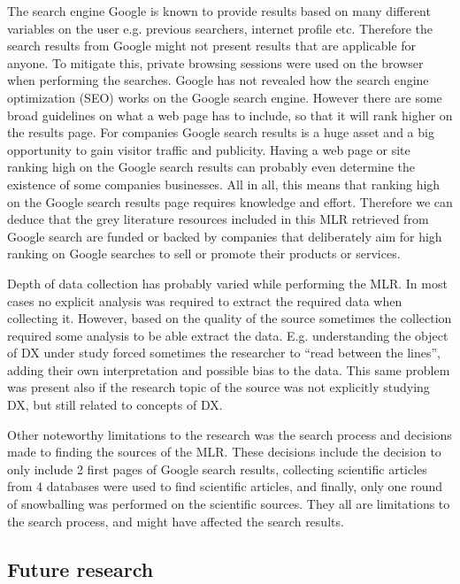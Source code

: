 \documentclass[english, 12pt, a4paper, sci, utf8, a-1b, online]{aaltothesis}
\begin{document}
The search engine Google is known to provide results based on many different variables on the user e.g. previous searchers, internet profile etc. Therefore the search results from Google might not present results that are applicable for anyone. To mitigate this, private browsing sessions were used on the browser when performing the searches. Google has not revealed how the search engine optimization (SEO) works on the Google search engine. However there are some broad guidelines on what a web page has to include, so that it will rank higher on the results page. For companies Google search results is a huge asset and a big opportunity to gain visitor traffic and publicity. Having a web page or site ranking high on the Google search results can probably even determine the existence of some companies businesses. All in all, this means that ranking high on the Google search results page requires knowledge and effort. Therefore we can deduce that the grey literature resources included in this MLR retrieved from Google search are funded or backed by companies that deliberately aim for high ranking on Google searches to sell or promote their products or services.

Depth of data collection has probably varied while performing the MLR. In most cases no explicit analysis was required to extract the required data when collecting it. However, based on the quality of the source sometimes the collection required some analysis to be able extract the data. E.g. understanding the object of DX under study forced sometimes the researcher to ``read between the lines'', adding their own interpretation and possible bias to the data. This same problem was present also if the research topic of the source was not explicitly  studying DX, but still related to concepts of DX.

Other noteworthy limitations to the research was the search process and decisions made to finding the sources of the MLR. These decisions include the decision to only include 2 first pages of Google search results, collecting scientific articles from 4 databases were used to find scientific articles, and finally, only one round of snowballing was performed on the scientific sources. They all are limitations to the search process, and might have affected the search results.

\subsection{Future research}
\end{document}
